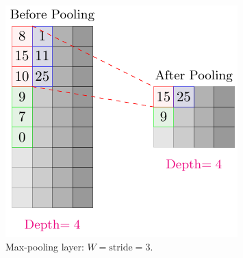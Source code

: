 \begin{figure}
\includegraphics[scale=1, center]{../tikz_per_manuscritto/pooling.pdf} 

\caption[Max-pooling layer.]{Max-pooling layer: $W = \mathrm{stride} = 3$. }\label{fig:pool_layer}
\end{figure}

